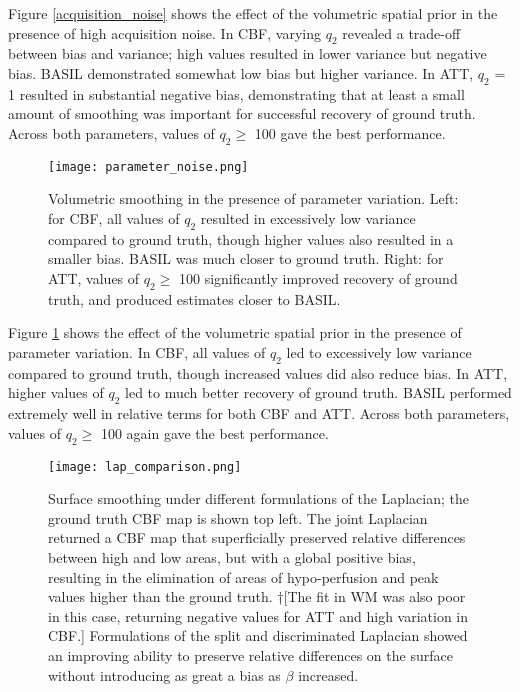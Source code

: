 Figure \ref{acquisition_noise} shows the effect of the volumetric spatial prior in the presence of high acquisition noise. In CBF, varying $q_2$ revealed a trade-off between bias and variance; high values resulted in lower variance but negative bias. BASIL demonstrated somewhat low bias but higher variance. In ATT, $q_2$ = 1 resulted in substantial negative bias, demonstrating that at least a small amount of smoothing was important for successful recovery of ground truth. Across both parameters, values of $q_2 \geq$ 100 gave the best performance. 

\begin{figure}[H]
\centering
\texttt{[image: parameter\_noise.png]}
\caption{Volumetric smoothing in the presence of parameter variation. Left: for CBF, all values of $q_2$ resulted in excessively low variance compared to ground truth, though higher values also resulted in a smaller bias. BASIL was much closer to ground truth. Right: for ATT, values of $q_2 \geq$ 100 significantly improved recovery of ground truth, and produced estimates closer to BASIL.}
\label{parameter_noise} 
\end{figure}

Figure \ref{parameter_noise} shows the effect of the volumetric spatial prior in the presence of parameter variation. In CBF, all values of $q_2$ led to excessively low variance compared to ground truth, though increased values did also reduce bias. In ATT, higher values of $q_2$ led to much better recovery of ground truth. BASIL performed extremely well in relative terms for both CBF and ATT. Across both parameters, values of $q_2 \geq$ 100 again gave the best performance. 

\begin{figure}[H]
\centering
\texttt{[image: lap\_comparison.png]}
\caption{Surface smoothing under different formulations of the Laplacian; the ground truth CBF map is shown top left. The joint Laplacian returned a CBF map that superficially preserved relative differences between high and low areas, but with a global positive bias, resulting in the elimination of areas of hypo-perfusion and peak values higher than the ground truth. †[The fit in WM was also poor in this case, returning negative values for ATT and high variation in CBF.] Formulations of the split and discriminated Laplacian showed an improving ability to preserve relative differences on the surface without introducing as great a bias as $\beta$ increased.}
\label{lap_comparison} 
\end{figure}

